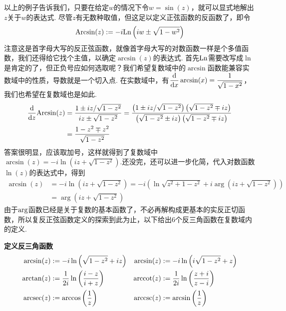 \documentclass[UTF8]{ctexart}
\newcommand{\trm}[1]{{\rm #1}}
\newenvironment{definition}[1]
    {\begin{tcolorbox}[enhanced, colback=LightYellow, breakable=false, frame hidden, borderline west={1.5mm}{-2mm}{DarkGreen}]
    {\bfseries {\color{DarkGreen} 定义}\quad #1} \newline}
    {\end{tcolorbox}}
\begin{document}
以上的例子告诉我们，只要在给定\(w\)的情况下令\(w=\sin(z)\)，就可以显式地解出\(z\)关于\(w\)的表达式. 尽管\(z\)有无数种取值，但这足以定义正弦函数的反函数了，即令
\[{\rm Arcsin}(z):=-i{\rm Ln}\left(iw \pm \sqrt{1-w^2}\right)\]
注意这是首字母大写的反正弦函数，就像首字母大写的对数函数一样是个多值函数，我们还得给它找个主值，以确定\(\arcsin(z)\)的表达式. 首先\({\rm Ln}\)需要改写成\(\ln\)是肯定的了，但正负号应如何选取呢？我们希望复数域中的\(\arcsin\)函数能兼容实数域中的性质，导数就是一个切入点. 在实数域中，有\(\displaystyle{\frac{\rm d}{{\rm d}x}\arcsin(x) = \frac{1}{\sqrt{1-x^2}}}\)，我们也希望在复数域也是如此.
\begin{align*}
    \frac{\rm d}{{\rm d}z}{\rm Arcsin}(z) &= \frac{1 \pm iz/\sqrt{1-z^2}}{iz \pm \sqrt{1-z^2}} = \frac{\left(1\pm iz/\sqrt{1-z^2}\right)\left(\sqrt{1-z^2}\mp iz\right)}{\left(\sqrt{1-z^2}\pm iz\right)\left(\sqrt{1-z^2}\mp iz\right)} \\
    &= \frac{1-z^2 \mp z^2}{\sqrt{1-z^2}}
\end{align*}
答案很明显，应该取加号，这样就得到了复数域中\(\displaystyle{\arcsin(z)=-i\ln\left(iz+\sqrt{1-z^2}\right)}\).还没完，还可以进一步化简，代入对数函数\(\ln(z)\)的表达式中，得到
\begin{align*}
    \arcsin(z) & =-i\ln\left(iz+\sqrt{1-z^2}\right) = -i\left(\ln\sqrt{z^2+1-z^2}+i\arg\left(iz+\sqrt{1-z^2}\right)\right) \\
    &= \arg\left(iz+\sqrt{1-z^2}\right)
\end{align*}
由于\(\trm{arg}\)函数已经是关于复数的基本函数了，不必再解构成更基本的实反正切函数，所以复反正弦函数定义的探索到此为止，以下给出6个反三角函数在复数域内的定义.
\begin{definition}{反三角函数}
    \[
        \begin{aligned}
            \arcsin(z) &:= -i\ln\left(\sqrt{1-z^2}+iz\right) & \arcsin(z) &:= -i\ln\left(i\sqrt{1-z^2}+z\right) \\
            \arctan(z) &:= \frac{1}{2i}\ln\left(\frac{i-z}{i+z}\right) & {\rm arccot}(z) &:= \frac{1}{2i}\ln\left(\frac{z+i}{z-i}\right) \\
            {\rm arcsec}(z) &:= \arccos\left(\frac{1}{z}\right) & {\rm arccsc}(z) &:= \arcsin\left(\frac{1}{z}\right)
        \end{aligned}
    \]
\end{definition}
\end{document}
